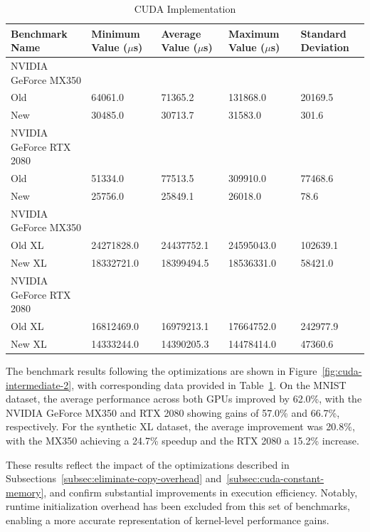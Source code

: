 \documentclass[modern,longauthor]{aastex7}
\begin{document}
\begin{table}[htb!]
\centering
\caption{CUDA Implementation\label{tab:cuda-intermediate-2}}
\begin{tabular}{p{5.5cm} p{2cm} p{2cm} p{2cm} p{2cm}}
\hline
Benchmark Name & Minimum Value ($\mu$s) & Average Value ($\mu$s) & Maximum Value ($\mu$s) & Standard Deviation \\
\hline
NVIDIA GeForce MX350 \\
\hspace{0.5cm}Old & 64061.0 & 71365.2 & 131868.0 & 20169.5 \\
\hspace{0.5cm}New & 30485.0 & 30713.7 & 31583.0 & 301.6 \\
NVIDIA GeForce RTX 2080 \\
\hspace{0.5cm}Old & 51334.0 & 77513.5 & 309910.0 & 77468.6 \\
\hspace{0.5cm}New & 25756.0 & 25849.1 & 26018.0 & 78.6 \\
\hline
NVIDIA GeForce MX350 \\
\hspace{0.5cm}Old XL & 24271828.0 & 24437752.1 & 24595043.0 & 102639.1 \\
\hspace{0.5cm}New XL & 18332721.0 & 18399494.5 & 18536331.0 & 58421.0 \\
NVIDIA GeForce RTX 2080 \\
\hspace{0.5cm}Old XL & 16812469.0 & 16979213.1 & 17664752.0 & 242977.9 \\
\hspace{0.5cm}New XL & 14333244.0 & 14390205.3 & 14478414.0 & 47360.6 \\
\hline
\end{tabular}
\end{table}
\FloatBarrier

The benchmark results following the optimizations are shown in Figure~\ref{fig:cuda-intermediate-2}, with corresponding data provided in Table~\ref{tab:cuda-intermediate-2}. On the MNIST dataset, the average performance across both GPUs improved by 62.0\%, with the NVIDIA GeForce MX350 and RTX 2080 showing gains of 57.0\% and 66.7\%, respectively. For the synthetic XL dataset, the average improvement was 20.8\%, with the MX350 achieving a 24.7\% speedup and the RTX 2080 a 15.2\% increase.

These results reflect the impact of the optimizations described in Subsections~\ref{subsec:eliminate-copy-overhead} and~\ref{subsec:cuda-constant-memory}, and confirm substantial improvements in execution efficiency. Notably, runtime initialization overhead has been excluded from this set of benchmarks, enabling a more accurate representation of kernel-level performance gains.
\end{document}
